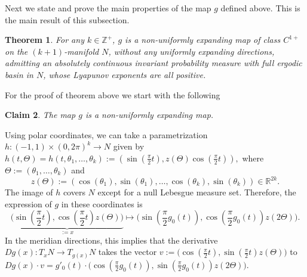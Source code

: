 \documentclass[reqno,12pt,a4paper]{amsart}
\theoremstyle{plain}
\newtheorem{theorem}{Theorem}[section]
\newtheorem{claim}[theorem]{Claim}
\theoremstyle{definition}
\begin{document}
Next we state and prove the main properties of the map $g$
defined above.  This is the main result of this subsection.

\begin{theorem} \label{thm:seg} For any $k\in{{\mathbb Z}}^+$, $g$ is
  a non-uniformly expanding map of class $C^{1+}$ on the
  $(k+1)$-manifold $N$, without any uniformly expanding
  directions, admitting an absolutely continuous invariant
  probability measure with full ergodic basin in $N$, whose
  Lyapunov exponents are all positive.
\end{theorem}

For the proof of theorem above we start with the following
\begin{claim}
  \label{claim:NUE}
  The map $g$ is a non-uniformly expanding map.
\end{claim}

Using polar coordinates, we can take a parametrization $h:
(-1,1) \times (0, 2\pi)^k \to N$ given by $ h(t,\Theta)=
h(t, \theta_1, \dots, \theta_k):= (\sin(\frac\pi2 t),
z(\Theta)\cos(\frac\pi2 t)), $ where $\Theta:= (\theta_1,
\dots, \theta_k)$ and
$$
z(\Theta):=
(\cos(\theta_1), \sin(\theta_1), \dots, \cos(\theta_k),
\sin(\theta_k)) \in {{\mathbb R}}^{2k}.
$$
The image of $h$ covers $N$ except for a null Lebesgue
measure set. 
Therefore, the expression of $g$ in these coordinates is
$$
\underbrace{\Big(\sin(\frac\pi2 t), \cos(\frac\pi2 t) z(\Theta)\Big)}_{:= x}
\longmapsto \Big(\sin( \frac\pi2 g_0(t)), \cos(\frac\pi2
g_0(t)) z(2\Theta) \Big).
$$
In the meridian directions, this implies that the derivative
$Dg(x): T_x N \to T_{g(x)} N$ takes the vector $v:=
\big(\cos(\frac\pi2 t), \sin(\frac\pi2 t) z(\Theta)\big)$ 
to 
$Dg(x) \cdot v=
g'_0(t) \cdot \big(\cos(\frac\pi2 g_0(t)), \sin(\frac\pi2 g_0(t))
z(2\Theta)\big)$. 
\end{document}
